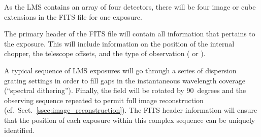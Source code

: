 As the LMS contains an array of four detectors, there will be four
image or cube extensions in the FITS file for one exposure.

The primary header of the FITS file will contain all information that
pertains to the exposure. This will include information on the
position of the internal chopper, the telescope offsets, and the type
of observation ( or ).

A typical sequence of LMS exposures will go through a series of
dispersion grating settings in order to fill gaps in the instantaneous
wavelength coverage (``spectral dithering''). Finally, the field will be
rotated by 90~degrees and the observing sequence repeated to permit
full image reconstruction
(cf.~Sect.~\ref{ssec:image_reconstruction}). The FITS header
information will ensure that the position of each exposure within this
complex sequence can be uniquely identified.



